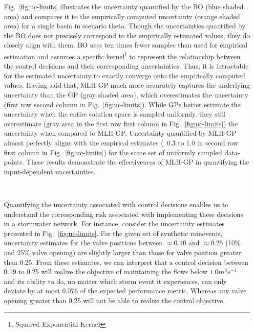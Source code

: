 Fig.~\ref{fig:uc-limits} illustrates the uncertainty quantified by the BO (blue shaded area) and compares it to the empirically computed uncertainty (orange shaded area) for a single basin in scenario theta.
Though the uncertainties quantified by the BO does not precisely correspond to the empirically estimated values, they do closely align with them.
BO uses ten times fewer samples than used for empirical estimation and assumes a specific kernel\footnote{Squared Exponential Kernel} to represent the relationship between the control decisions and their corresponding uncertainties.
Thus, it is intractable for the estimated uncertainty to exactly converge onto the empirically computed values.
Having said that, MLH-GP much more accurately captures the underlying uncertainty than the GP (gray shaded area), which overestimates the uncertainty  (first row second column in Fig.~\ref{fig:uc-limits}).
While GPs better estimate the uncertainty when the entire solution space is sampled uniformly, they still overestimate (gray area in the first row first column in Fig.~\ref{fig:uc-limits}) the uncertainty when compared to MLH-GP\@.
Uncertainty quantified by MLH-GP almost perfectly aligns with the empirical estimates (~0.3 to 1.0 in second row first column in Fig.~\ref{fig:uc-limits}) for the same set of uniformly sampled data-points.
These results demonstrate the effectiveness of MLH-GP in quantifying the input-dependent uncertainties. 

\


Quantifying the uncertainty associated with control decisions enables us to understand the corresponding risk associated with implementing these decisions in a stormwater network. 
For instance, consider the uncertainty estimates presented in Fig.~\ref{fig:uc-limits}.
For the given set of synthetic rainevents, uncertainty estimates for the valve positions between $\approx0.10$ and $\approx0.25$ (10\% and 25\% valve opening) are slightly larger than those for valve position greater than 0.25.  
From these estimates, we can interpret that a control decision between 0.19 to 0.25 will realize the objective of maintaining the flows below $1.0 m^3 s^{-1}$ and its ability to do, no matter which storm event it experiences, can only deviate by at most 0.076 of the expected performance metric.
Whereas any valve opening greater than 0.25 will not be able to realize the control objective.


